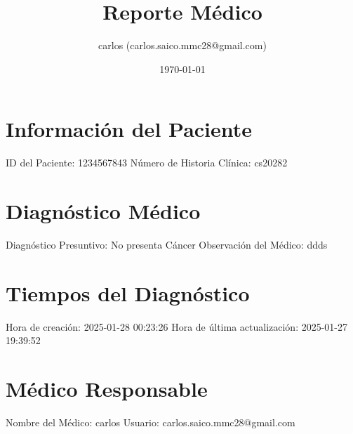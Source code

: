 \documentclass{article}%
\title{Reporte Médico}%
\author{carlos (carlos.saico.mmc28@gmail.com)}%
\date{\today}%
\begin{document}
%
\normalsize%
\maketitle%
\section{Información del Paciente}%
\label{sec:InformacindelPaciente}%
ID del Paciente: 1234567843\newline%
%
Número de Historia Clínica: cs20282\newline%

%
\section{Diagnóstico Médico}%
\label{sec:DiagnsticoMdico}%
Diagnóstico Presuntivo: No presenta Cáncer\newline%
%
Observación del Médico:\newline%
ddds\newline%

%
\section{Tiempos del Diagnóstico}%
\label{sec:TiemposdelDiagnstico}%
Hora de creación: 2025{-}01{-}28 00:23:26\newline%
%
Hora de última actualización: 2025{-}01{-}27 19:39:52\newline%

%
\section{Médico Responsable}%
\label{sec:MdicoResponsable}%
Nombre del Médico: carlos\newline%
%
Usuario: carlos.saico.mmc28@gmail.com\newline%

%
\end{document}
